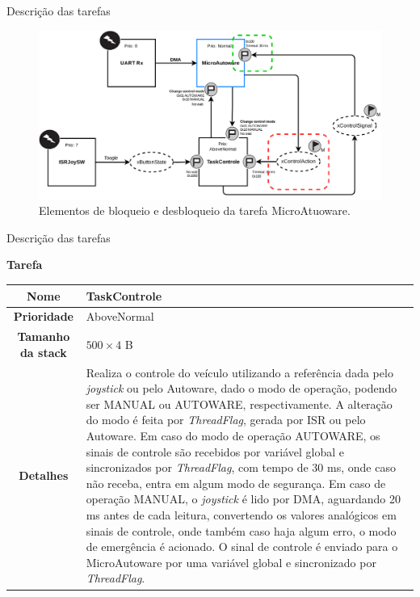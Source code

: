 \documentclass{if-beamer}
\begin{document}
\begin{frame}{Descrição das tarefas}

\begin{figure}
	\centering
	\includegraphics[width = \textwidth]{img/microautoware_blockrelease}
	\caption{Elementos de bloqueio e desbloqueio da tarefa MicroAtuoware.}
	\label{fig:microautoware_blockrelease}
\end{figure}

\end{frame}



\begin{frame}{Descrição das tarefas}
	
\begin{block}{\textbf{Tarefa}}
	
	\centering
	
	\begin{tabular}{c|p{8cm}}
		\textbf{Nome} & TaskControle \\
		\hline
		\textbf{Prioridade}& AboveNormal \\
		\hline
		\textbf{Tamanho da stack} & $500 \times 4$ B \\
		\hline
		\textbf{Detalhes} & Realiza o controle do veículo utilizando a referência dada pelo \textit{joystick} ou pelo Autoware, dado o modo de operação, podendo ser MANUAL ou AUTOWARE, respectivamente. A alteração do modo é feita por \textit{ThreadFlag}, gerada por ISR ou pelo Autoware. Em caso do modo de operação AUTOWARE, os sinais de controle são recebidos por variável global e sincronizados por \textit{ThreadFlag}, com tempo de 30 ms, onde caso não receba, entra em algum modo de segurança. Em caso de operação MANUAL,  o \textit{joystick} é lido por DMA, aguardando 20 ms antes de cada leitura,  convertendo os valores analógicos em sinais de controle, onde também caso haja algum erro, o modo de emergência é acionado. O sinal de controle é enviado para o MicroAutoware por uma variável global e sincronizado por \textit{ThreadFlag}. 
	\end{tabular}
	
\end{block}	
	
\end{frame}
\end{document}
